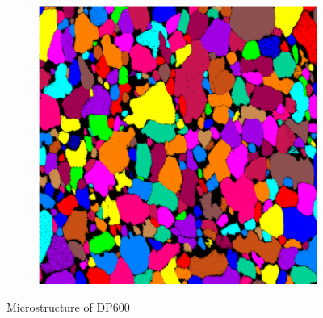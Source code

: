 \documentclass{article}
\begin{document}
\begin{figure}[h!]
\begin{subfigure}[b]{0.3\textwidth}
         \caption{}
         \label{fig:Micro2_600}
     \end{subfigure}
          \hfill
     \begin{subfigure}[b]{0.3\textwidth}
         \centering
         \includegraphics[width=\textwidth]{Micro3_600.png}
         \caption{}
         \label{fig:Micro3_600}
     \end{subfigure}
     \caption{Microstructure of DP600}
     \label{fig:Micro_600}
\end{figure}
\end{document}
